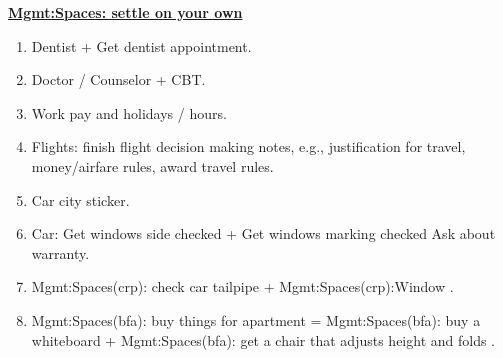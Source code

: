 \begin{multicols}{4}
\begin{minipage}{\columnwidth}

\end{minipage}

%

\begin{minipage}{\columnwidth}

\end{minipage}


\begin{minipage}{\columnwidth}
 
\end{minipage}

\begin{minipage}{\columnwidth}

\end{minipage}

\begin{minipage}{\columnwidth}

\end{minipage}

\begin{minipage}{\columnwidth}
\underline{\bf \tiny {Mgmt:Spaces: settle on your own}}
\begin{enumerate}
  \tiny \item \tiny Dentist + Get dentist appointment.
\item \tiny Doctor / Counselor + CBT.
\item \tiny Work pay and holidays / hours. 
\item \tiny Flights: finish flight decision making notes, e.g.,
  justification for travel, money/airfare rules, award travel rules. 
\item \tiny Car city sticker.
\item \tiny Car: Get windows side checked + Get windows marking
  checked Ask about warranty.
\item \tiny Mgmt:Spaces(crp): check car tailpipe +
  Mgmt:Spaces(crp):Window .
\item \tiny Mgmt:Spaces(bfa): buy things for apartment =
Mgmt:Spaces(bfa): buy a whiteboard + Mgmt:Spaces(bfa): get a chair 
that adjusts height and folds \te{} \dl{} \pr{}.
\end{enumerate}
\end{minipage}


\end{multicols}
